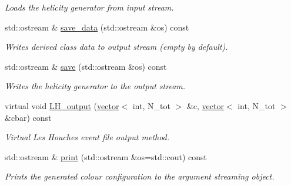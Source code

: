 \begin{DoxyCompactItemize}
\begin{DoxyCompactList}\small\item\em Loads the helicity generator from input stream. \end{DoxyCompactList}\item 
\hypertarget{a00083_aa0c93af977b7f06181662b47cad7a027}{std\-::ostream \& \hyperlink{a00083_aa0c93af977b7f06181662b47cad7a027}{save\-\_\-data} (std\-::ostream \&os) const }\label{a00083_aa0c93af977b7f06181662b47cad7a027}

\begin{DoxyCompactList}\small\item\em Writes derived class data to output stream (empty by default). \end{DoxyCompactList}\item 
\hypertarget{a00083_a2ee9708a63aea165e710cce5a9a39ee3}{std\-::ostream \& \hyperlink{a00083_a2ee9708a63aea165e710cce5a9a39ee3}{save} (std\-::ostream \&os) const }\label{a00083_a2ee9708a63aea165e710cce5a9a39ee3}

\begin{DoxyCompactList}\small\item\em Writes the helicity generator to the output stream. \end{DoxyCompactList}\item 
\hypertarget{a00083_aa38500f37b0c93d47b15a295df352c00}{virtual void \hyperlink{a00083_aa38500f37b0c93d47b15a295df352c00}{L\-H\-\_\-output} (\hyperlink{a00559}{vector}$<$ int, N\-\_\-tot $>$ \&c, \hyperlink{a00559}{vector}$<$ int, N\-\_\-tot $>$ \&cbar) const }\label{a00083_aa38500f37b0c93d47b15a295df352c00}

\begin{DoxyCompactList}\small\item\em Virtual Les Houches event file output method. \end{DoxyCompactList}\item 
std\-::ostream \& \hyperlink{a00083_a788d9e734974be65bc030e08f044f1b9}{print} (std\-::ostream \&os=std\-::cout) const 
\begin{DoxyCompactList}\small\item\em Prints the generated colour configuration to the argument streaming object. \end{DoxyCompactList}\end{DoxyCompactItemize}
